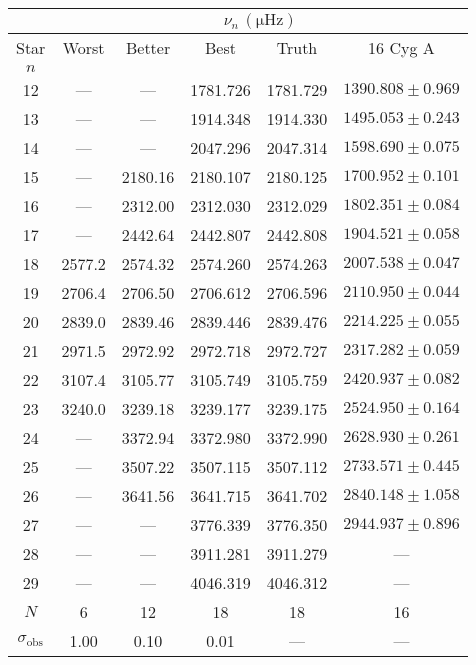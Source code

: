 \begin{tabular}{c|cccc|c}
\toprule
 & \multicolumn{5}{c}{$\nu_n \, (\mathrm{\mu Hz})$} \\
\midrule
Star & Worst & Better & Best & Truth & 16 Cyg A \\
$n$ &  &  &  &  &  \\
\midrule
12 & --- & --- & 1781.726 & 1781.729 & $1390.808 \pm 0.969$ \\
13 & --- & --- & 1914.348 & 1914.330 & $1495.053 \pm 0.243$ \\
14 & --- & --- & 2047.296 & 2047.314 & $1598.690 \pm 0.075$ \\
15 & --- & 2180.16 & 2180.107 & 2180.125 & $1700.952 \pm 0.101$ \\
16 & --- & 2312.00 & 2312.030 & 2312.029 & $1802.351 \pm 0.084$ \\
17 & --- & 2442.64 & 2442.807 & 2442.808 & $1904.521 \pm 0.058$ \\
18 & 2577.2 & 2574.32 & 2574.260 & 2574.263 & $2007.538 \pm 0.047$ \\
19 & 2706.4 & 2706.50 & 2706.612 & 2706.596 & $2110.950 \pm 0.044$ \\
20 & 2839.0 & 2839.46 & 2839.446 & 2839.476 & $2214.225 \pm 0.055$ \\
21 & 2971.5 & 2972.92 & 2972.718 & 2972.727 & $2317.282 \pm 0.059$ \\
22 & 3107.4 & 3105.77 & 3105.749 & 3105.759 & $2420.937 \pm 0.082$ \\
23 & 3240.0 & 3239.18 & 3239.177 & 3239.175 & $2524.950 \pm 0.164$ \\
24 & --- & 3372.94 & 3372.980 & 3372.990 & $2628.930 \pm 0.261$ \\
25 & --- & 3507.22 & 3507.115 & 3507.112 & $2733.571 \pm 0.445$ \\
26 & --- & 3641.56 & 3641.715 & 3641.702 & $2840.148 \pm 1.058$ \\
27 & --- & --- & 3776.339 & 3776.350 & $2944.937 \pm 0.896$ \\
28 & --- & --- & 3911.281 & 3911.279 & --- \\
29 & --- & --- & 4046.319 & 4046.312 & --- \\
\midrule%
$N$ & 6 & 12 & 18 & 18 & 16 \\
$\sigma_\mathrm{obs}$ & 1.00 & 0.10 & 0.01 & --- & --- \\
\bottomrule
\end{tabular}
